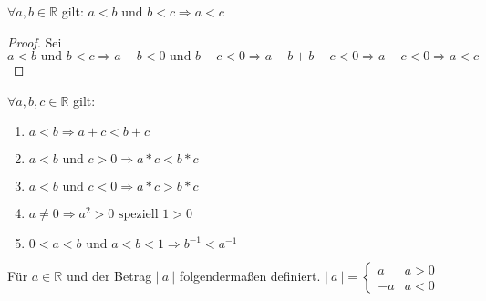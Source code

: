 \documentclass[a4paper,titlepage,oneside]{article}
\def\R{\ensuremath{\mathbb{R}} }
\def\fa{\ensuremath{\forall}}
\newcommand{\abs}[1]{\ensuremath{\left|\:#1\:\right|}}
\theoremstyle{thmstyle}
\begin{document}
\begin{subprop}
\(\fa a, b \in \R \) gilt: \(a < b \text{ und } b < c \Rightarrow a < c\)
\begin{proof}
Sei \( a < b \text{ und } b < c \Rightarrow a - b < 0  \text{ und } b - c < 0 \Rightarrow a - b + b - c < 0 \Rightarrow a - c < 0 \Rightarrow a < c\)
\end{proof}
\end{subprop}

\begin{subbem}
\(\fa a, b, c \in \R\) gilt:
\begin{enumerate}[label=\alph*)]
	\item \(a < b \Rightarrow a + c < b + c\)
	\item \(a < b \text{ und } c > 0 \Rightarrow a * c < b * c\)
	\item \(a < b \text{ und } c < 0 \Rightarrow a * c > b * c\)
	\item \(a \ne 0 \Rightarrow a^2 > 0 \text{ speziell } 1 > 0\)
	\item \(0 < a < b \text{ und } a < b < 1 \Rightarrow b^{-1} < a^{-1}\)
\end{enumerate}
\end{subbem}

\begin{subdefi}
Für \(a \in \R\) und der Betrag \abs{a} folgendermaßen definiert.
$\abs{a} = \begin{cases}
		 a 	& a > 0\\
		-a 	& a < 0  \end{cases}$
\end{subdefi}
\end{document}

